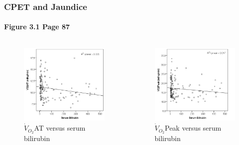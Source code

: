 \documentclass[10pt]{beamer}
\begin{document}
\begin{frame}
	\frametitle{CPET and Jaundice}
	\framesubtitle{Figure 3.1 Page 87}
	\begin{columns}[t]
			\begin{figure}
				\centering
				\includegraphics[width=\textwidth]{../Figures/cpet_oj_scatter_at_bil}
				\caption{$\dot{V}_{O_2}$AT versus serum bilirubin}
				\label{fig:cpet_oj_scatter_at_bil}
			\end{figure}
			
			\begin{figure}
				\includegraphics[width=\textwidth]{../Figures/cpet_oj_scatter_peak_bil}
				\caption{$\dot{V}_{O_2}$Peak versus serum bilirubin}
				\label{fig:cpet_oj_scatter_peak_bil}
			\end{figure}
	\end{columns}
\end{frame}
\end{document}
